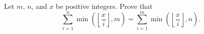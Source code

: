 Let $m$, $n$, and $x$ be positive integers. Prove that \[ \sum_{i = 1}^n \min\left(\left\lfloor \frac{x}{i} \right\rfloor, m \right) = \sum_{i = 1}^m \min\left(\left\lfloor \frac{x}{i} \right\rfloor, n \right). \]
